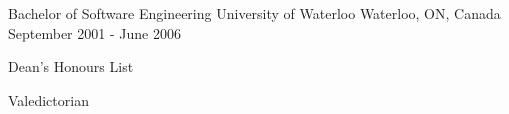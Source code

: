 

\begin{cventries}

  \cventry
    {Bachelor of Software Engineering} %
    {University of Waterloo} %
    {Waterloo, ON, Canada} %
    {September 2001 - June 2006} %
    {
      \begin{cvitems} %
        \item {Dean's Honours List}
        \item {Valedictorian}
      \end{cvitems}
    }

\end{cventries}
